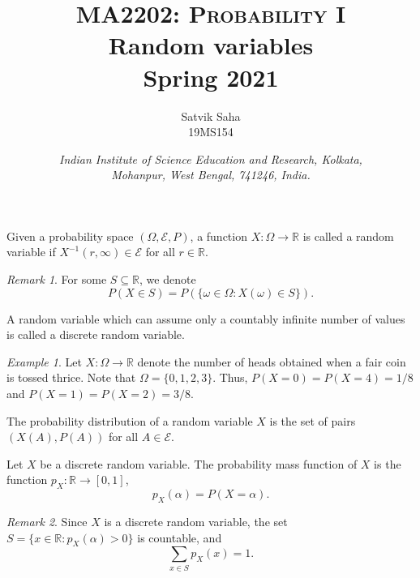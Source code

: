 \documentclass[11pt]{article}
\title{
    \Large\textsc{MA2202: Probability I} \\
    \Huge \textbf{Random variables} \\
    \vspace{5pt}
    \Large{Spring 2021}
}
\author{
    \large Satvik Saha%
    \\\textsc{\small 19MS154}
}
\date{\normalsize
    \textit{Indian Institute of Science Education and Research, Kolkata, \\
    Mohanpur, West Bengal, 741246, India.} \\
}
\def\R{\mathbb{R}}
\theoremstyle{definition}
\theoremstyle{remark}
\newtheorem*{remark}{Remark}
\newtheorem*{example}{Example}
\numberwithin{equation}{module}
\begin{document}
    \maketitle

    \begin{definition}
        Given a probability space $(\Omega, \mathcal{E}, P)$, a function $X\colon
        \Omega \to \R$ is called a random variable if $X^{-1}(r, \infty)
        \in \mathcal{E}$ for all $r \in \R$.

        \begin{remark}
            For some $S \subseteq \R$, we denote \[
                P(X \in S) = P(\{\omega \in \Omega\colon X(\omega) \in S\}).
            \] 
        \end{remark}
    \end{definition}
    
    \begin{definition}
        A random variable which can assume only a countably infinite number of
        values is called a discrete random variable.
    \end{definition}
    \begin{example}
        Let $X\colon \Omega \to \R$ denote the number of heads obtained when a fair
        coin is tossed thrice. Note that $\Omega = \{0, 1, 2, 3\}$. Thus, 
        $P(X = 0) = P(X = 4) = 1 /8$ and $P(X = 1) = P(X = 2) = 3 /8$.
    \end{example}

    \begin{definition}
        The probability distribution of a random variable $X$ is the set of pairs
        $(X(A), P(A))$ for all $A \in \mathcal{E}$.
    \end{definition}

    \begin{definition}
        Let $X$ be a discrete random variable. The probability mass function of $X$
        is the function $p_X\colon \R \to [0, 1]$, \[
            p_X(\alpha) = P(X = \alpha).
        \]

        \begin{remark}
            Since $X$ is a discrete random variable, the set $S = \{x \in \R \colon
            p_X(\alpha) > 0\}$ is countable, and \[
                \sum_{x \in S} p_X(x) = 1.
            \] 
        \end{remark}
    \end{definition}
\end{document}
